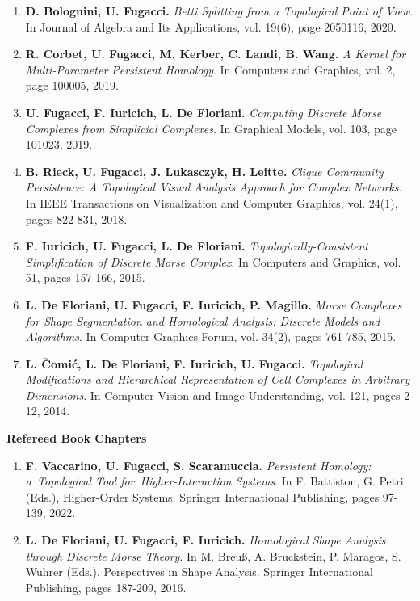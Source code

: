 \documentclass[11pt]{article}
\begin{document}
\begin{enumerate}
\item {\bf D. Bolognini, U. Fugacci.} {\em Betti Splitting from a Topological Point of View}. In Journal of Algebra and Its Applications, vol. 19(6), page 2050116, 2020.

\item {\bf R. Corbet, U. Fugacci, M. Kerber, C. Landi, B. Wang.} {\em A Kernel for Multi-Parameter Persistent Homology}. In Computers and Graphics, vol. 2, page 100005, 2019.

\item {\bf U. Fugacci, F. Iuricich, L. De Floriani.} {\em Computing Discrete Morse Complexes from Simplicial Complexes}. In Graphical Models, vol. 103, page 101023, 2019.

\item {\bf B. Rieck, U. Fugacci, J. Lukasczyk, H. Leitte.} {\em Clique Community Persistence: A Topological Visual Analysis Approach for Complex Networks}. In IEEE Transactions on Visualization and Computer Graphics, vol. 24(1), pages 822-831, 2018.

\item {\bf F. Iuricich, U. Fugacci, L. De Floriani.} {\em Topologically-Consistent Simplification of Discrete Morse Complex}. In Computers and Graphics, vol. 51, pages 157-166, 2015. %

\item {\bf L. De Floriani, U. Fugacci, F. Iuricich, P. Magillo.} {\em Morse Complexes for Shape Segmentation and Homological Analysis: Discrete Models and Algorithms}. In Computer Graphics Forum, vol. 34(2), pages 761-785, 2015.

\item {\bf L. {\v C}omi{\' c}, L. De Floriani, F. Iuricich, U. Fugacci.} {\em Topological Modifications and Hierarchical Representation of Cell Complexes in Arbitrary Dimensions}. In Computer Vision and Image Understanding, vol. 121, pages 2-12, 2014.

\end{enumerate}
\vspace*{1ex}

\noindent
{\bf Refereed Book Chapters}

\begin{enumerate}

\item {\bf F. Vaccarino, U. Fugacci, S. Scaramuccia.} {\em Persistent Homology: a Topological Tool for Higher-Interaction Systems}. In F. Battiston, G. Petri (Eds.), Higher-Order Systems. Springer International Publishing, pages 97-139, 2022.

\item {\bf L. De Floriani, U. Fugacci, F. Iuricich.} {\em Homological Shape Analysis through Discrete Morse Theory}. In M. Breu{\ss}, A. Bruckstein, P. Maragos, S. Wuhrer (Eds.), Perspectives in Shape Analysis. Springer International Publishing, pages 187-209, 2016.

\end{enumerate}
\vspace*{3ex}
\end{document}
